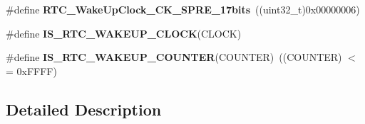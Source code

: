 \begin{DoxyCompactItemize}
\item 
\hypertarget{group___r_t_c___wakeup___timer___definitions_ga586423d0381e6822eaa030e9272708a2}{\#define {\bfseries R\-T\-C\-\_\-\-Wake\-Up\-Clock\-\_\-\-C\-K\-\_\-\-S\-P\-R\-E\-\_\-17bits}~((uint32\-\_\-t)0x00000006)}\label{group___r_t_c___wakeup___timer___definitions_ga586423d0381e6822eaa030e9272708a2}

\item 
\#define {\bfseries I\-S\-\_\-\-R\-T\-C\-\_\-\-W\-A\-K\-E\-U\-P\-\_\-\-C\-L\-O\-C\-K}(C\-L\-O\-C\-K)
\item 
\hypertarget{group___r_t_c___wakeup___timer___definitions_ga6254b48843bdcb83b5b5cd640aeb6f9c}{\#define {\bfseries I\-S\-\_\-\-R\-T\-C\-\_\-\-W\-A\-K\-E\-U\-P\-\_\-\-C\-O\-U\-N\-T\-E\-R}(C\-O\-U\-N\-T\-E\-R)~((C\-O\-U\-N\-T\-E\-R) $<$= 0x\-F\-F\-F\-F)}\label{group___r_t_c___wakeup___timer___definitions_ga6254b48843bdcb83b5b5cd640aeb6f9c}

\end{DoxyCompactItemize}


\subsection{Detailed Description}


